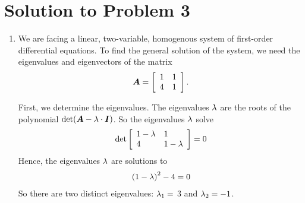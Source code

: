 \documentclass[letterpaper,12pt,leqno]{article}
\begin{document}
\section*{Solution to Problem 3}
\begin{enumerate}
\item We are facing a linear, two-variable, homogenous system of first-order differential equations. To find the general solution of the system, we need the eigenvalues and eigenvectors of the matrix 
\begin{align*}
\bm{A}=\left[ 
\begin{array}{ll}
1 & 1 \\ 
4 & 1 
\end{array} \right].
\end{align*}

First, we determine the eigenvalues. The eigenvalues $\lambda$ are the roots of the polynomial $\det(\bm{A}-\lambda\cdot \bm{I})$. So the eigenvalues $\lambda$ solve
 \begin{align*}
\det\left[ \begin{array}{ll}
1-\lambda & 1 \\ 
4 & 1-\lambda 
\end{array} \right] =0
\end{align*}
Hence, the eigenvalues $\lambda$ are solutions to
\begin{align*}
\left( 1-\lambda \right) ^{2}-4=0
\end{align*}
So there are two distinct eigenvalues: $\lambda_{1}=$ $3$ and $\lambda_{2}=-1$.


\end{enumerate}
\end{document}
